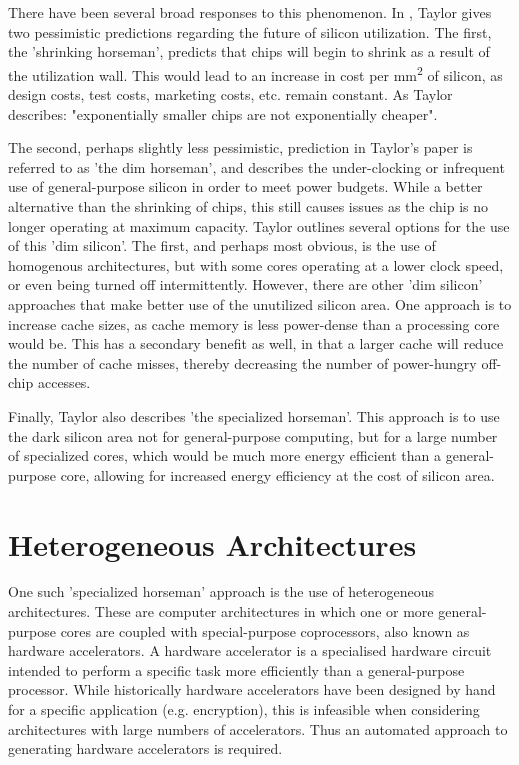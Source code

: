 \documentclass{UoYCSproject}
\begin{document}
There have been several broad responses to this phenomenon.
In \cite{four-horsemen}, Taylor gives two pessimistic predictions regarding the future of silicon
utilization. The first, the 'shrinking horseman', predicts that chips will begin to shrink as a result of
the utilization wall. This would lead to an increase in cost per mm\textsuperscript{2} of silicon, as
design costs, test costs, marketing costs, etc. remain constant. As Taylor describes: "exponentially smaller chips are not
exponentially cheaper".

The second, perhaps slightly less pessimistic, prediction in Taylor's paper
is referred to as 'the dim horseman', and describes the under-clocking or infrequent use of
general-purpose silicon in order to meet power budgets. While a better alternative than the shrinking
of chips, this still causes issues as the chip is no longer operating at maximum capacity.
Taylor outlines several options for the use of this 'dim silicon'. The first, and perhaps most obvious,
is the use of homogenous architectures, but with some cores operating at a lower clock speed, or
even being turned off intermittently. However, there are other 'dim silicon' approaches that make better
use of the unutilized silicon area. One approach is to increase cache sizes, as cache memory is less
power-dense than a processing core would be. This has a secondary benefit as well, in that a larger
cache will reduce the number of cache misses, thereby decreasing the number of power-hungry off-chip
accesses.

Finally, Taylor also describes 'the specialized horseman'. This approach is to use the dark silicon area
not for general-purpose computing, but for a large number of specialized cores, which would be much
more energy efficient than a general-purpose core, allowing for increased energy efficiency at the
cost of silicon area.

\section{Heterogeneous Architectures}

One such 'specialized horseman' approach is the use of heterogeneous architectures.
These are computer architectures in which one or more general-purpose cores are coupled with special-purpose coprocessors,
also known as hardware accelerators. A hardware accelerator is a specialised hardware circuit intended to perform a
specific task more efficiently than a general-purpose processor. While historically hardware accelerators have been designed by
hand for a specific application (e.g. encryption), this is infeasible when considering architectures
with large numbers of accelerators. Thus an automated approach to generating hardware accelerators is required.
\end{document}

